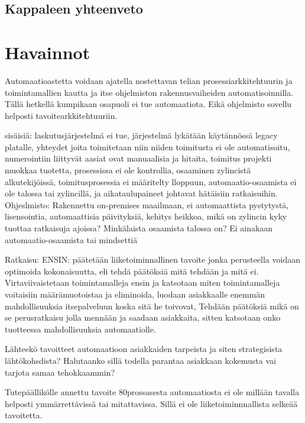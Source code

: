 \documentclass[finnish,12pt,a4paper,pdftex]{article}
\begin{document}
\subsection{Kappaleen yhteenveto}


\clearpage

\section{Havainnot}

Automaatioastetta voidaan ajatella nostettavan telian prosessiarkkitehtuurin ja toimintamallien kautta ja itse ohjelmiston rakennusvaiheiden automatisoinnilla. Tällä hetkellä kumpikaan osapuoli ei tue automaatiota. Eikä ohjelmisto sovellu helposti tavoitearkkitehtuuriin.

sisäisiä: laskutusjärjestelmä ei tue, järjestelmä lykätään käytännössä legacy platalle, yhteydet joita toimitetaan niin niiden toimitusta ei ole automatisoitu, numerointiin liittyvät aasiat ovat manuaalisia ja hitaita, toimitus projekti muokkaa tuotetta, prosessissa ei ole kontrollia, osaaminen zylincistä alkutekijöissä, toimitusprosessia ei määritelty lloppuun, automaatio-osaamista ei ole talossa tai zylincillä, ja aikataulupaineet johtavat hätäisiin ratkaisuihin. 
Ohjeslmisto: Rakennettu on-premises maailmaan, ei automaattista pystytystä, lisensointia, automaattisia päivityksiä, kehitys heikkoa,  mikä on zylincin kyky tuottaa ratkaisuja ajoissa? Minkälaista osaamista talossa on? Ei ainakaan automaatio-osaamista tai mindsettiä

Ratkaisu: ENSIN: päätetään liiketoiminnallinen tavoite jonka perusteella voidaan optimoida kokonaisuutta, eli tehdä päätöksiä mitä tehdään ja mitä ei. Virtaviivaistetaan toimintamalleja ensin ja katsotaan miten toimintamalleja voitaisiin määrämuotoistaa ja eliminoida, luodaan asiakkaalle enemmän mahdollisuuksia itsepalveluun koska sitä he toivovat, Tehdään päätöksiä mikä on se perusratkaisu jolla mennään ja saadaan asiakkaita, sitten katsotaan onko tuotteessa mahdollisuuksia automaatiolle.

Lähteekö tavoitteet automaatioon asiakkaiden tarpeista ja siten strategisista lähtökohsdista? Halutaanko sillä todella parantaa asiakkaan kokemusta vai tarjota samaa tehokkaammin?

Tutepäällikölle annettu tavoite 80prossasesta automaatiosta ei ole millään tavalla helposti ymmärrettävissä tai mitattavissa. Sillä ei ole liiketoiminnnallista selkeää tavoitetta. 
\end{document}
